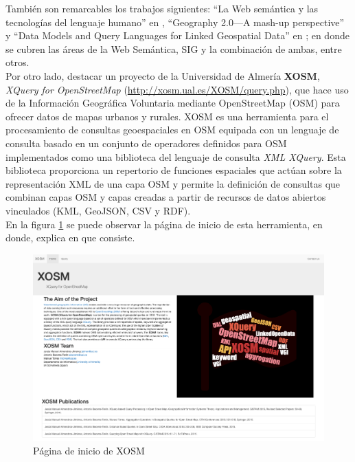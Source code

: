 También son remarcables los trabajos siguientes: ``La Web semántica y las tecnologías del lenguaje humano'' en \cite{researchgate}, ``Geography 2.0—A mash-up perspective'' \cite{gml} y ``Data Models and Query Languages for Linked Geospatial Data'' en \cite{wkt-database}; en donde se cubren las áreas de la Web Semántica, SIG y la combinación de ambas, entre otros.\\

Por otro lado, destacar un proyecto de la Universidad de Almería \textbf{XOSM}, \textit{XQuery for OpenStreetMap} (\url{http://xosm.ual.es/XOSM/query.php}), que hace uso de la Información Geográfica Voluntaria mediante OpenStreetMap (OSM) para ofrecer datos de mapas urbanos y rurales. XOSM es una herramienta para el procesamiento de consultas geoespaciales en OSM equipada con un lenguaje de consulta basado en un conjunto de operadores definidos para OSM implementados como una biblioteca del lenguaje de consulta \textit{XML XQuery}. Esta biblioteca proporciona un repertorio de funciones espaciales que actúan sobre la representación XML de una capa OSM y permite la definición de consultas que combinan capas OSM y capas creadas a partir de recursos de datos abiertos vinculados (KML, GeoJSON, CSV y RDF). \\

En la figura \ref{fig:1-6} se puede observar la página de inicio de esta herramienta, en donde, explica en que consiste. 





\begin{figure}[H]
	\centering
	\includegraphics[width=1\linewidth]{imagenes/capitulo6/1}
	\caption{Página de inicio de XOSM}
	\label{fig:1-6}
\end{figure}

